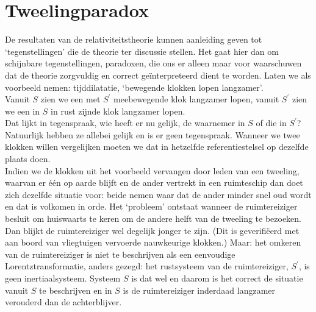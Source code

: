 \section{Tweelingparadox}
De resultaten van de relativiteitstheorie kunnen aanleiding geven tot 
`tegenstellingen' die de theorie ter discussie stellen.
Het gaat hier dan om schijnbare tegenstellingen, paradoxen, die ons er 
alleen maar voor waarschuwen dat de theorie zorgvuldig en correct 
ge\"{i}nterpreteerd dient te worden.
Laten we als voorbeeld nemen: tijddilatatie, 
`bewegende klokken lopen langzamer'.\\
Vanuit $S$ zien we een met $S^{'}$ meebewegende klok langzamer lopen, 
vanuit $S^{'}$ zien we een in $S$ in rust zijnde klok langzamer lopen.\\
Dat lijkt in tegenspraak, wie heeft er nu gelijk, de waarnemer in $S$ of 
die in $S^{'}$?
Natuurlijk hebben ze allebei gelijk en is er geen tegenspraak.
Wanneer we twee klokken willen vergelijken moeten we dat in hetzelfde 
referentiestelsel op dezelfde plaats doen.\\
Indien we de klokken uit het voorbeeld vervangen door leden van een tweeling, 
waarvan er \'{e}\'{e}n op aarde blijft en de ander vertrekt in een ruimteschip 
dan doet zich dezelfde situatie voor: beide nemen waar dat de ander minder 
snel oud wordt en dat is volkomen in orde.
Het `probleem' ontstaat wanneer de ruimtereiziger besluit om huiswaarts te 
keren om de andere helft van de tweeling te bezoeken.
Dan blijkt de ruimtereiziger wel degelijk jonger te zijn.
(Dit is geverifi\"{e}erd met aan boord van vliegtuigen vervoerde nauwkeurige 
klokken.)
Maar: het omkeren van de ruimtereiziger is niet te beschrijven als een 
eenvoudige Lorentztransformatie, anders gezegd: het rustsysteem van de 
ruimtereiziger, $S^{'}$, is geen inertiaalsysteem.
Systeem  $S$ 
is dat wel en daarom is het correct de situatie vanuit $S$ te beschrijven 
en in $S$ is de ruimtereiziger inderdaad langzamer verouderd dan de 
achterblijver.



